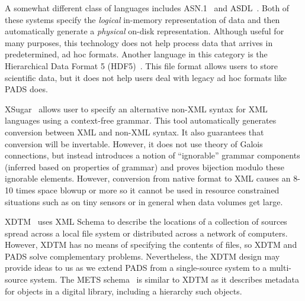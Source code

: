 \documentclass[10pt]{article}
\begin{document}

A somewhat different class of languages includes
\textsc{ASN.1}~\cite{asn} and \textsc{ASDL}~\cite{asdl}.  Both of
these systems specify the {\em logical\/} in-memory representation of
data and then automatically generate a {\em physical\/} on-disk
representation.  Although useful for many purposes, this technology
does not help process data that arrives in predetermined, ad hoc
formats.  Another language in this category is the Hierarchical Data
Format 5 (HDF5)~\cite{hdf5}.  This file format allows users to store
scientific data, but it does not help users deal with legacy ad hoc
formats like PADS does.


XSugar~\cite{brabrand+:xsugar2005} allows user to specify an
alternative non-XML syntax for XML languages using a context-free
grammar.  This tool automatically generates conversion between XML and
non-XML syntax. It also guarantees that conversion will be invertable.
However, it does not use theory of Galois connections, but instead
introduces a notion of ``ignorable'' grammar components (inferred
based on properties of grammar) and proves bijection modulo these
ignorable elements.  However, conversion from native format to
XML causes an 8-10 times space blowup or more so it cannot be
used in resource constrained situations such as on tiny sensors
or in general when data volumes get large.

XDTM~\cite{zhao+:sigmod05,xdtm} uses XML Schema to describe the
locations of a collection of sources spread across a local file system
or distributed across a network of computers.  However, XDTM has no
means of specifying the contents of files, so XDTM and PADS solve
complementary problems.  Nevertheless, the XDTM design may provide
ideas to us as we extend PADS from a single-source system to a
multi-source system. The METS schema~\cite{mets} is similar to XDTM as
it describes metadata for objects in a digital library, including a
hierarchy such objects.
\end{document}
